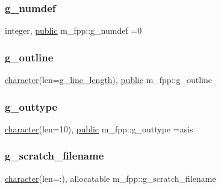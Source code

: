 \mbox{\label{namespacem__fpp_a59fae4b75a68fde011c594b60e4b92a5}} 
\subsubsection{\texorpdfstring{g\+\_\+numdef}{g\_numdef}}
{\footnotesize\ttfamily integer, \hyperlink{M__stopwatch_83_8txt_a2f74811300c361e53b430611a7d1769f}{public} m\+\_\+fpp\+::g\+\_\+numdef =0}

\mbox{\label{namespacem__fpp_a7d195a44ce2fda4dc4f152fd174f0a86}} 
\subsubsection{\texorpdfstring{g\+\_\+outline}{g\_outline}}
{\footnotesize\ttfamily \hyperlink{option__stopwatch_83_8txt_abd4b21fbbd175834027b5224bfe97e66}{character}(len=\hyperlink{namespacem__fpp_ab93f8756cf248cf8db932573009d4664}{g\+\_\+line\+\_\+length}), \hyperlink{M__stopwatch_83_8txt_a2f74811300c361e53b430611a7d1769f}{public} m\+\_\+fpp\+::g\+\_\+outline}

\mbox{\label{namespacem__fpp_aced59ed7cc330b1975f7d89c808273eb}} 
\subsubsection{\texorpdfstring{g\+\_\+outtype}{g\_outtype}}
{\footnotesize\ttfamily \hyperlink{option__stopwatch_83_8txt_abd4b21fbbd175834027b5224bfe97e66}{character}(len=10), \hyperlink{M__stopwatch_83_8txt_a2f74811300c361e53b430611a7d1769f}{public} m\+\_\+fpp\+::g\+\_\+outtype =\textquotesingle{}asis\textquotesingle{}}

\mbox{\label{namespacem__fpp_a228eed7955304567f03bab1a1b39c4ab}} 
\subsubsection{\texorpdfstring{g\+\_\+scratch\+\_\+filename}{g\_scratch\_filename}}
{\footnotesize\ttfamily \hyperlink{option__stopwatch_83_8txt_abd4b21fbbd175834027b5224bfe97e66}{character}(len=\+:), allocatable m\+\_\+fpp\+::g\+\_\+scratch\+\_\+filename}

